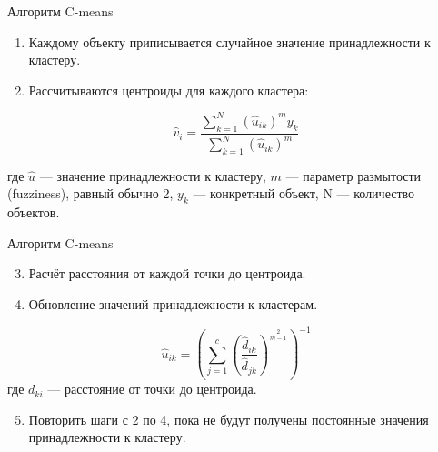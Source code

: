 \documentclass[
  ignorenonframetext,
  russian,
]{beamer}
\providecommand{\tightlist}{%
  \setlength{\itemsep}{0pt}\setlength{\parskip}{0pt}}
\begin{document}
\begin{frame}{Алгоритм C-means}
\protect{}\label{ux430ux43bux433ux43eux440ux438ux442ux43c-c-means}
\begin{enumerate}
\item
  Каждому объекту приписывается случайное значение принадлежности к
  кластеру.
\item
  Рассчитываются центроиды для каждого кластера:
\end{enumerate}

\[\hat{v}_{i} = \frac{\sum^{N}_{k=1}(\hat{u}_{ik})^{m}y_k}{\sum^{N}_{k=1}(\hat{u}_{ik})^m}\]

\scriptsize

где \(\hat{u}\) --- значение принадлежности к кластеру, \(m\) ---
параметр размытости (fuzziness), равный обычно 2, \(y_k\) --- конкретный
объект, N --- количество объектов.
\end{frame}

\begin{frame}{Алгоритм C-means}
\protect{}\label{ux430ux43bux433ux43eux440ux438ux442ux43c-c-means-1}
\begin{enumerate}
\setcounter{enumi}{2}
\item
  Расчёт расстояния от каждой точки до центроида.
\item
  Обновление значений принадлежности к кластерам.
\end{enumerate}

\scriptsize

\[\hat{u}_{ik} = (\sum^{c}_{j=1}(\frac{\hat{d}_{ik}}{\hat{d}_{jk}})^{\frac{2}{m-1}})^{-1}\]
где \(d_{ki}\) --- расстояние от точки до центроида.

\begin{enumerate}
\setcounter{enumi}{4}
\tightlist
\item
  Повторить шаги с 2 по 4, пока не будут получены постоянные значения
  принадлежности к кластеру.
\end{enumerate}
\end{frame}
\end{document}
